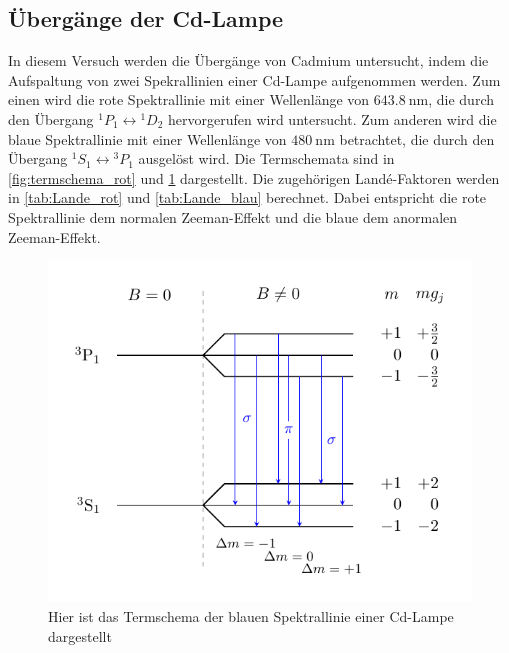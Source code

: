 \subsection{Übergänge der Cd-Lampe}
In diesem Versuch werden die Übergänge von Cadmium untersucht, indem
die Aufspaltung von zwei Spekrallinien einer Cd-Lampe aufgenommen werden.
Zum einen wird die rote Spektrallinie mit einer Wellenlänge von $\SI{643,8}{\nano\meter}$, die durch den Übergang
${}^1P_1\leftrightarrow{}^1D_2$ hervorgerufen wird untersucht.
Zum anderen wird die blaue Spektrallinie mit einer Wellenlänge von $\SI{480}{\nano\meter}$ betrachtet,
die durch den Übergang ${}^1S_1\leftrightarrow{}^3P_1$ ausgelöst wird.
Die Termschemata sind in \ref{fig:termschema_rot} und \ref{fig:termschema_blau} dargestellt.
Die zugehörigen Landé-Faktoren werden in \ref{tab:Lande_rot} und \ref{tab:Lande_blau} berechnet.
Dabei entspricht die rote Spektrallinie dem normalen Zeeman-Effekt und die blaue dem anormalen Zeeman-Effekt.
\begin{figure}[!h]
\centering
\includegraphics[scale=1.15]{termschema_blau.pdf}
\caption{Hier ist das Termschema der blauen Spektrallinie einer Cd-Lampe dargestellt\label{fig:termschema_blau}}
\end{figure}
